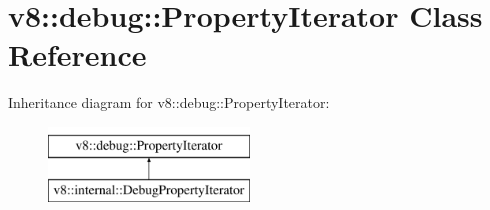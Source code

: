 \hypertarget{classv8_1_1debug_1_1PropertyIterator}{}\section{v8\+:\+:debug\+:\+:Property\+Iterator Class Reference}
\label{classv8_1_1debug_1_1PropertyIterator}
Inheritance diagram for v8\+:\+:debug\+:\+:Property\+Iterator\+:\begin{figure}[H]
\begin{center}
\leavevmode
\includegraphics[height=2.000000cm]{classv8_1_1debug_1_1PropertyIterator}
\end{center}
\end{figure}
